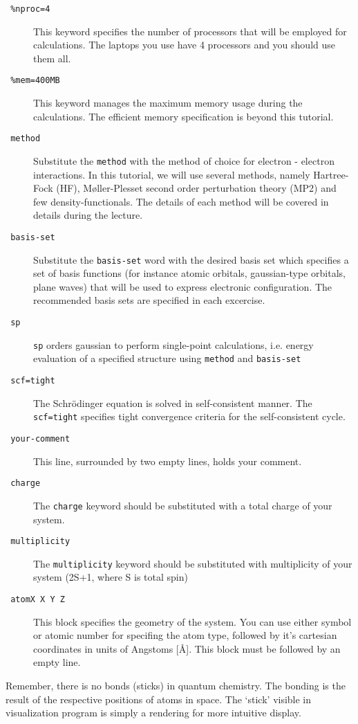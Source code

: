 \begin{description}
  \item[\texttt{ \%nproc=4}] This keyword specifies the number of processors that will be employed for calculations. The laptops you use have 4 processors and you should use them all. 
  \item[\texttt{ \%mem=400MB}] This keyword manages the maximum memory usage during the calculations. The efficient memory specification is beyond this tutorial. 
  \item[\texttt{ method}]Substitute the \texttt{method} with the method of choice for electron - electron interactions. In this tutorial, we will use several methods, namely Hartree-Fock (HF), Møller-Plesset second order perturbation theory  (MP2) and few density-functionals. The details of each method will be covered in details during the lecture. 
  \item[\texttt{ basis-set}] Substitute the \texttt{basis-set} word with the desired basis set which specifies a set of basis functions (for instance atomic orbitals, gaussian-type orbitals, plane waves) that will be used to express electronic configuration. The recommended basis sets are specified in each excercise. 
  \item[\texttt{ sp}] \texttt{sp} orders gaussian to perform single-point calculations, i.e. energy evaluation of a specified structure using \texttt{method} and \texttt{basis-set}
  \item[\texttt{ scf=tight}] The Schrödinger equation is solved in self-consistent manner. The \texttt{scf=tight} specifies tight convergence criteria for the self-consistent cycle. 
  \item[\texttt{ your-comment}] This line, surrounded by two empty lines, holds your comment. 
  \item[\texttt{ charge}] The \texttt{charge} keyword should be substituted with a total charge of your system. 
  \item[\texttt{ multiplicity}] The \texttt{multiplicity} keyword should be substituted with multiplicity of your system (2S+1, where S is total spin)
  \item[\texttt{ atomX X Y Z}] This block specifies the geometry of the system. You can use either symbol or atomic number for specifing the atom type, followed by it's cartesian coordinates in units of Angstoms [\AA]. This block must be followed by an empty line. 
\end{description}

Remember, there is no bonds (sticks) in quantum chemistry. The bonding is the result of the respective positions of atoms in space. The `stick' visible in visualization program is simply a rendering for more intuitive display. 


